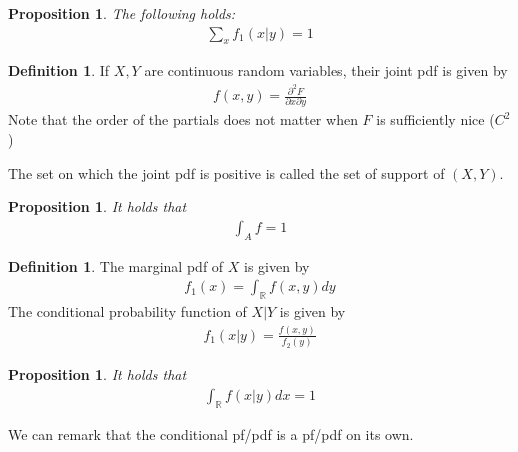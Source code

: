 \documentclass[11pt]{amsart}
\newtheorem{proposition}[theorem]{Proposition}
\theoremstyle{definition}
\newtheorem{definition}[theorem]{Definition}
\numberwithin{equation}{section}
\begin{document}
\begin{proposition}
    The following holds:
    \begin{align*}
        \sum_xf_1(x|y)=1
    \end{align*}
\end{proposition}
\begin{definition}
    If $X,Y$ are continuous random variables, their joint pdf is given by
    \begin{align*}
        f(x,y)=\frac{\partial^2F}{\partial x\partial y}
    \end{align*}
    Note that the order of the partials does not matter when $F$ is sufficiently nice ($C^2$)

    The set on which the joint pdf is positive is called the set of support of $(X,Y)$.
\end{definition}
\begin{proposition}
    It holds that
    \begin{align*}
        \int_Af=1
    \end{align*}
\end{proposition}
\begin{definition}
    The marginal pdf of $X$ is given by
    \begin{align*}
        f_1(x)=\int_\mathbb Rf(x,y)dy
    \end{align*}
    The conditional probability function of $X|Y$ is given by
    \begin{align*}
        f_1(x|y)=\frac{f(x,y)}{f_2(y)}
    \end{align*}
\end{definition}
\begin{proposition}
    It holds that 
    \begin{align*}
        \int_\mathbb Rf(x|y)dx=1
    \end{align*}
\end{proposition}
We can remark that the conditional pf/pdf is a pf/pdf on its own.
\end{document}
